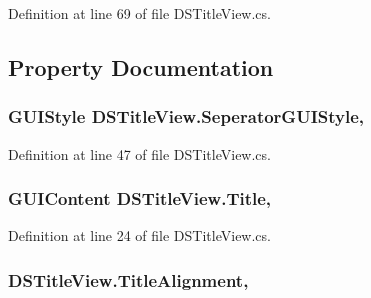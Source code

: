 Definition at line 69 of file D\+S\+Title\+View.\+cs.



\subsection{Property Documentation}
\hypertarget{class_d_s_title_view_a2477e370b44e411587715d5c91d7419c}{
\subsubsection[{Seperator\+G\+U\+I\+Style}]{\setlength{\rightskip}{0pt plus 5cm}G\+U\+I\+Style D\+S\+Title\+View.\+Seperator\+G\+U\+I\+Style\hspace{0.3cm}{\ttfamily [get]}, {\ttfamily [set]}}}\label{class_d_s_title_view_a2477e370b44e411587715d5c91d7419c}


Definition at line 47 of file D\+S\+Title\+View.\+cs.

\hypertarget{class_d_s_title_view_af317c06b95eab8c9e876afbfe60bb82e}{
\subsubsection[{Title}]{\setlength{\rightskip}{0pt plus 5cm}G\+U\+I\+Content D\+S\+Title\+View.\+Title\hspace{0.3cm}{\ttfamily [get]}, {\ttfamily [set]}}}\label{class_d_s_title_view_af317c06b95eab8c9e876afbfe60bb82e}


Definition at line 24 of file D\+S\+Title\+View.\+cs.

\hypertarget{class_d_s_title_view_a24d42521a3eb5c4d452ee39861d9beb1}{
\subsubsection[{Title\+Alignment}]{ D\+S\+Title\+View.\+Title\+Alignment\hspace{0.3cm}{\ttfamily [get]}, {\ttfamily [set]}}}\label{class_d_s_title_view_a24d42521a3eb5c4d452ee39861d9beb1}


